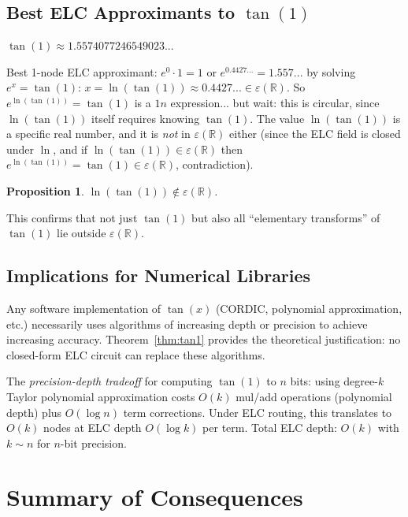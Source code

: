 \documentclass[11pt]{article}
\newtheorem{proposition}[theorem]{Proposition}
\begin{document}
\subsection{Best ELC Approximants to $\tan(1)$}

$\tan(1)\approx 1.5574077246549023...$

Best 1-node ELC approximant: $e^0\cdot1=1$ or $e^{0.4427...}=1.557...$
by solving $e^x=\tan(1)$: $x=\ln(\tan(1))\approx0.4427...\in\varepsilon(\mathbb{R})$.
So $e^{\ln(\tan(1))}=\tan(1)$ is a $1n$ expression... but wait: this is circular,
since $\ln(\tan(1))$ itself requires knowing $\tan(1)$. The value $\ln(\tan(1))$ is
a specific real number, and it is \emph{not} in $\varepsilon(\mathbb{R})$ either
(since the ELC field is closed under $\ln$, and if $\ln(\tan(1))\in\varepsilon(\mathbb{R})$
then $e^{\ln(\tan(1))}=\tan(1)\in\varepsilon(\mathbb{R})$, contradiction).

\begin{proposition}
$\ln(\tan(1))\notin\varepsilon(\mathbb{R})$.
\end{proposition}

This confirms that not just $\tan(1)$ but also all ``elementary transforms'' of $\tan(1)$
lie outside $\varepsilon(\mathbb{R})$.

\subsection{Implications for Numerical Libraries}

Any software implementation of $\tan(x)$ (CORDIC, polynomial approximation, etc.)
necessarily uses algorithms of increasing depth or precision to achieve increasing accuracy.
Theorem~\ref{thm:tan1} provides the theoretical justification: no closed-form ELC circuit
can replace these algorithms.

The \emph{precision-depth tradeoff} for computing $\tan(1)$ to $n$ bits:
using degree-$k$ Taylor polynomial approximation costs $O(k)$ mul/add operations (polynomial depth)
plus $O(\log n)$ term corrections. Under ELC routing, this translates to $O(k)$ nodes
at ELC depth $O(\log k)$ per term. Total ELC depth: $O(k)$ with $k\sim n$ for $n$-bit precision.

\section{Summary of Consequences}
\end{document}
